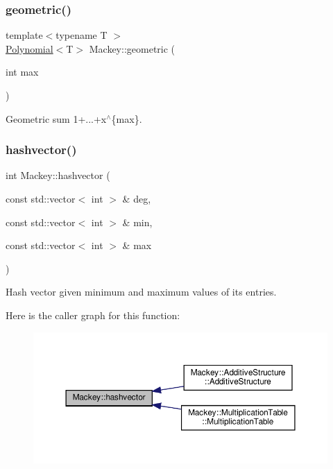 \subsubsection{\texorpdfstring{geometric()}{geometric()}}
{\footnotesize\ttfamily template$<$typename T $>$ \\
\hyperlink{classMackey_1_1Polynomial}{Polynomial}$<$T$>$ Mackey\+::geometric (\begin{DoxyParamCaption}\item[{int}]{max }\end{DoxyParamCaption})}



Geometric sum 1+...+x$^\wedge$\{max\}. 

\mbox{\label{namespaceMackey_ae57418329a761aa68d26d68b637fe9dd}} 
\subsubsection{\texorpdfstring{hashvector()}{hashvector()}}
{\footnotesize\ttfamily int Mackey\+::hashvector (\begin{DoxyParamCaption}\item[{const std\+::vector$<$ int $>$ \&}]{deg,  }\item[{const std\+::vector$<$ int $>$ \&}]{min,  }\item[{const std\+::vector$<$ int $>$ \&}]{max }\end{DoxyParamCaption})}



Hash vector given minimum and maximum values of its entries. 

Here is the caller graph for this function\+:\nopagebreak
\begin{figure}[H]
\begin{center}
\leavevmode
\includegraphics[width=350pt]{namespaceMackey_ae57418329a761aa68d26d68b637fe9dd_icgraph}
\end{center}
\end{figure}
\mbox{\label{namespaceMackey_a1c195484cc947abef84c726b534af5a5}} 
